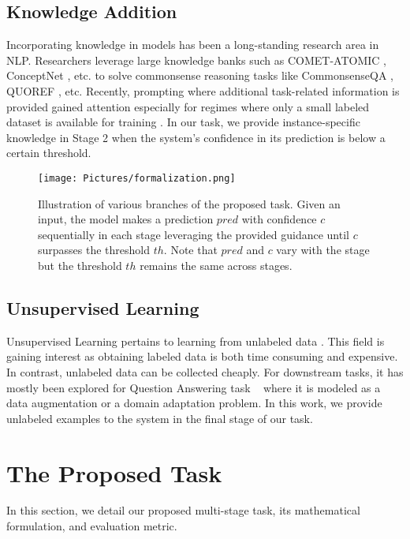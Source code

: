 \documentclass[11pt,a4paper]{article}
\begin{document}
\subsection{Knowledge Addition}
Incorporating knowledge in models has been a long-standing research area in NLP.
Researchers leverage large knowledge banks such as COMET-ATOMIC \cite{hwang2020comet}, ConceptNet \cite{speer2017conceptnet}, etc. to solve commonsense reasoning tasks \cite{Mitra2019ExploringWT,chang-etal-2020-incorporating,shen-etal-2020-exploiting,Mishra2020TowardsQF} like CommonsenseQA \cite{talmor-etal-2019-commonsenseqa}, QUOREF \cite{dasigi-etal-2019-quoref}, etc.
Recently, prompting where additional task-related information is provided gained attention especially for regimes where only a small labeled dataset is available for training \cite{shin-etal-2020-autoprompt,schick-schutze-2021-exploiting,le-scao-rush-2021-many,Mishra2021NaturalIB}.
In our task, we provide instance-specific knowledge in Stage 2 when the system's confidence in its prediction is below a certain threshold.
\begin{figure}[t]
    \centering
    \texttt{[image: Pictures/formalization.png]}
    \caption{Illustration of various branches of the proposed task. Given an input, the model makes a prediction $pred$ with confidence $c$ sequentially in each stage leveraging the provided guidance until $c$ surpasses the threshold $th$. Note that $pred$ and $c$ vary with the stage but the threshold $th$ remains the same across stages.}
    \label{fig:formalization}
\end{figure}
\subsection{Unsupervised Learning}
Unsupervised Learning pertains to learning from unlabeled data \cite{lewis-etal-2019-unsupervised}.
This field is gaining interest as obtaining labeled data is both time consuming and expensive. In contrast, unlabeled data can be collected cheaply.
For downstream tasks, it has mostly been explored for Question Answering task ~\cite{chung-etal-2018-supervised,yang-etal-2017-semi, dhingra-etal-2018-simple,wang-jiang-2019-explicit,alberti-etal-2019-synthetic} where it is modeled as a data augmentation or a domain adaptation problem.
In this work, we provide unlabeled examples to the system in the final stage of our task.


\section{The Proposed Task}
\label{proposed_task}
In this section, we detail our proposed multi-stage task, its mathematical formulation, and evaluation metric.
\end{document}
